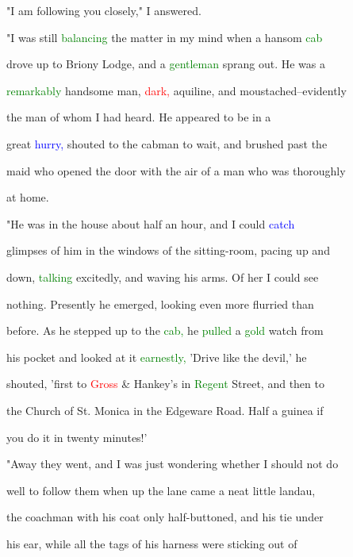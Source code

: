  "I am following you closely," I answered.



 "I was still \textcolor{green}{balancing} the matter in my mind when a hansom \textcolor{green}{cab}

 drove up to Briony Lodge, and a \textcolor{green}{gentleman} sprang out. He was a

 \textcolor{green}{remarkably} handsome man, \textcolor{red}{dark,} aquiline, and moustached--evidently

 the man of whom I had heard. He appeared to be in a

 great \textcolor{blue}{hurry,} \textcolor{BurntOrange}{shouted} to the cabman to \textcolor{BurntOrange}{wait,} and brushed past the

 maid who opened the door with the air of a man who was thoroughly

 at home.



 "He was in the house about half an hour, and I could \textcolor{blue}{catch}

 glimpses of him in the windows of the sitting-room, pacing up and

 down, \textcolor{green}{talking} excitedly, and waving his arms. Of her I could see

 nothing. Presently he emerged, looking even more flurried than

 before. As he stepped up to the \textcolor{green}{cab,} he \textcolor{green}{pulled} a \textcolor{green}{gold} \textcolor{BurntOrange}{watch} from

 his pocket and looked at it \textcolor{green}{earnestly,} 'Drive like the \textcolor{BurntOrange}{devil,'} he

 \textcolor{BurntOrange}{shouted,} 'first to \textcolor{red}{Gross} & Hankey's in \textcolor{green}{Regent} Street, and then to

 the \textcolor{BurntOrange}{Church} of St. Monica in the Edgeware Road. Half a guinea if

 you do it in twenty minutes!'



 "Away they went, and I was just wondering whether I should not do

 well to follow them when up the lane came a neat little landau,

 the coachman with his coat only half-buttoned, and his tie under

 his ear, while all the tags of his harness were sticking out of

